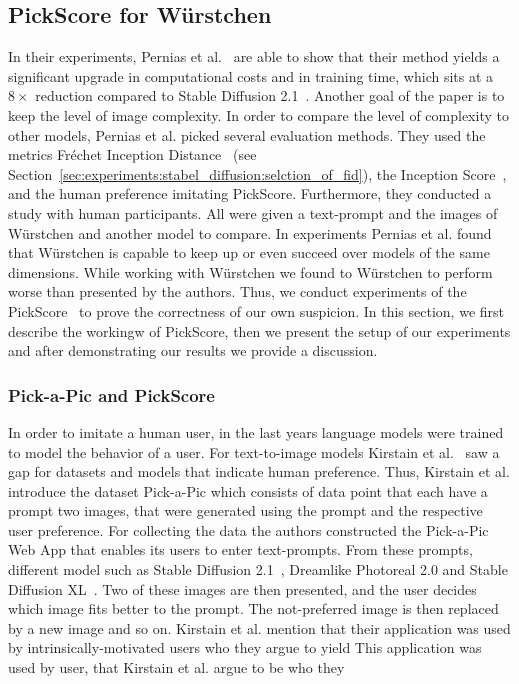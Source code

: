 \subsection{PickScore for W\"urstchen}
In their experiments, Pernias et al.~\cite{pernias2024wrstchen} are able to show
that their method yields a significant upgrade in computational costs and in
training time, which sits at a $8\times$ reduction compared to Stable Diffusion
2.1~\cite{rombach2023sd_2_1}. Another goal of the paper is to keep the level of
image complexity. In order to compare the level of complexity to other models,
Pernias et al. picked several evaluation methods. They used the metrics
Fr\'echet Inception Distance~\cite{heusel2018ganstrainedtimescaleupdate} (see
Section~\ref{sec:experiments:stabel_diffusion:selction_of_fid}), the Inception
Score~\cite{ding2021cogviewmasteringtexttoimagegeneration}, and the human preference imitating
PickScore. Furthermore, they conducted a study with human participants. All were
given a text-prompt and the images of W\"urstchen and another model to compare.
In experiments Pernias et al. found that W\"urstchen is capable to keep up or
even succeed over models of the same dimensions. While working with W\"urstchen
we found to W\"urstchen to perform worse than presented by the authors. Thus, we
conduct experiments of the PickScore~\cite{kirstain2023pickapic} to
prove the correctness of our own suspicion. In this section, we first describe
the workingw of PickScore, then we present the setup of our experiments and
after demonstrating our results we provide a discussion.

\subsubsection{Pick-a-Pic and PickScore}
In order to imitate a human user, in the last years language models were trained
to model the behavior of a user. For text-to-image models Kirstain et
al.~\cite{kirstain2023pickapic} saw a gap for datasets and models that
indicate human preference. Thus, Kirstain et al. introduce the dataset
Pick-a-Pic which consists of data point that each have a prompt two images, that
were generated using the prompt and the respective user preference. For
collecting the data the authors constructed the Pick-a-Pic Web App that enables
its users to enter text-prompts. From these prompts, different model such as
Stable Diffusion 2.1~\cite{rombach2023sd_2_1}, Dreamlike Photoreal 2.0 and
Stable Diffusion XL~\cite{podell2024sdxl}. Two of these images are then
presented, and the user decides which image fits better to the prompt. The
not-preferred image is then replaced by a new image and so on. Kirstain et al.
mention that their application was used by intrinsically-motivated users who
they argue to yield
This application
was used by user, that Kirstain et al. argue to be  who they

